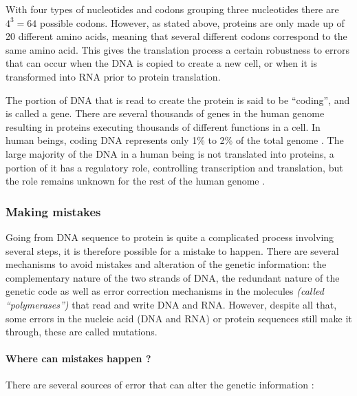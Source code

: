\documentclass[
  11pt,
  twoside,
  BCOR=10mm,
  listof=totoc]{scrbook}
\begin{document}
With four types of nucleotides and codons grouping three nucleotides there are \(4^3=64\) possible codons. However, as stated above, proteins are only made up of 20 different amino acids, meaning that several different codons correspond to the same amino acid. This gives the translation process a certain robustness to errors that can occur when the DNA is copied to create a new cell, or when it is transformed into RNA prior to protein translation.

The portion of DNA that is read to create the protein is said to be ``coding'', and is called a gene. There are several thousands of genes in the human genome \autocite{internationalhumangenomesequencingconsortiumFinishingEuchromaticSequence2004} resulting in proteins executing thousands of different functions in a cell. In human beings, coding DNA represents only 1\% to 2\% of the total genome \autocite{elkonCharacterizationNoncodingRegulatory2017,omennReflectionsHUPOHuman2021}. The large majority of the DNA in a human being is not translated into proteins, a portion of it has a regulatory role, controlling transcription and translation, but the role remains unknown for the rest of the human genome \autocite{shabalinaMammalianTranscriptomeFunction2004,IntegratedEncyclopediaDNA2012}.

\hypertarget{making-mistakes}{%
\subsubsection{Making mistakes}\label{making-mistakes}}

Going from DNA sequence to protein is quite a complicated process involving several steps, it is therefore possible for a mistake to happen. There are several mechanisms to avoid mistakes and alteration of the genetic information: the complementary nature of the two strands of DNA, the redundant nature of the genetic code as well as error correction mechanisms in the molecules \emph{(called ``polymerases'')} that read and write DNA and RNA. However, despite all that, some errors in the nucleic acid (DNA and RNA) or protein sequences still make it through, these are called mutations.

\hypertarget{where-can-mistakes-happen}{%
\paragraph{Where can mistakes happen ?}\label{where-can-mistakes-happen}}

There are several sources of error that can alter the genetic information \autocite{chatterjee2017}:
\end{document}
